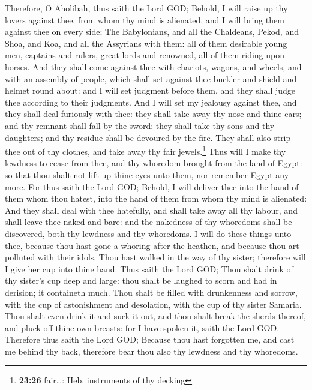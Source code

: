  Therefore, O Aholibah, thus saith the Lord GOD; Behold,
I will raise up thy lovers against thee, from whom thy mind is
alienated, and I will bring them against thee on every side;
 The Babylonians, and all the Chaldeans, Pekod, and Shoa,
and Koa, and all the Assyrians with them: all of them desirable young
men, captains and rulers, great lords and renowned, all of them riding
upon horses.  And they shall come against thee with
chariots, wagons, and wheels, and with an assembly of people, which
shall set against thee buckler and shield and helmet round about: and I
will set judgment before them, and they shall judge thee according to
their judgments.  And I will set my jealousy against
thee, and they shall deal furiously with thee: they shall take away thy
nose and thine ears; and thy remnant shall fall by the sword: they shall
take thy sons and thy daughters; and thy residue shall be devoured by
the fire.  They shall also strip thee out of thy clothes,
and take away thy fair jewels.\footnote{\textbf{23:26} fair\ldots: Heb.
  instruments of thy decking}  Thus will I make thy
lewdness to cease from thee, and thy whoredom brought from the land of
Egypt: so that thou shalt not lift up thine eyes unto them, nor remember
Egypt any more.  For thus saith the Lord GOD; Behold, I
will deliver thee into the hand of them whom thou hatest, into the hand
of them from whom thy mind is alienated:  And they shall
deal with thee hatefully, and shall take away all thy labour, and shall
leave thee naked and bare: and the nakedness of thy whoredoms shall be
discovered, both thy lewdness and thy whoredoms.  I will
do these things unto thee, because thou hast gone a whoring after the
heathen, and because thou art polluted with their idols. 
Thou hast walked in the way of thy sister; therefore will I give her cup
into thine hand.  Thus saith the Lord GOD; Thou shalt
drink of thy sister's cup deep and large: thou shalt be laughed to scorn
and had in derision; it containeth much.  Thou shalt be
filled with drunkenness and sorrow, with the cup of astonishment and
desolation, with the cup of thy sister Samaria.  Thou
shalt even drink it and suck it out, and thou shalt break the sherds
thereof, and pluck off thine own breasts: for I have spoken it, saith
the Lord GOD.  Therefore thus saith the Lord GOD; Because
thou hast forgotten me, and cast me behind thy back, therefore bear thou
also thy lewdness and thy whoredoms.

